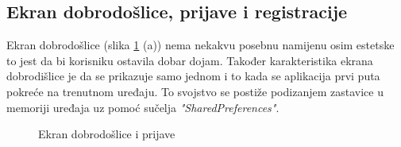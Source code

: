 \documentclass[times, utf8, zavrsni]{fer}
\begin{document}
\subsection{Ekran dobrodošlice, prijave i registracije}
Ekran dobrodošlice (slika \ref{fig:WelcomeLogin} (a)) nema nekakvu posebnu namijenu osim estetske to jest da bi
korisniku ostavila dobar dojam. Također karakteristika ekrana dobrodišlice je
da se prikazuje samo jednom i to kada se aplikacija prvi puta pokreće na trenutnom
uređaju. To svojstvo se postiže podizanjem zastavice u memoriji uređaja uz pomoć
sučelja \textit{"SharedPreferences"}.
\begin{figure}[h]
      \centering
      \caption{Ekran dobrodošlice i prijave}
      \label{fig:WelcomeLogin}
\end{figure}
\end{document}
